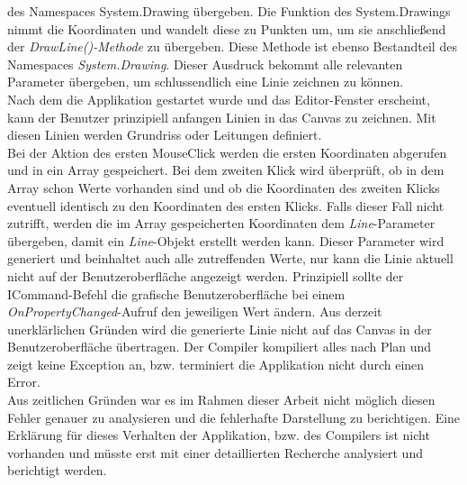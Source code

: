 des Namespaces System.Drawing übergeben. Die Funktion des System.Drawings nimmt die Koordinaten und wandelt diese zu Punkten um, um sie anschließend 
der \textit{DrawLine()-Methode} zu übergeben. Diese Methode ist ebenso Bestandteil des Namespaces \textit{System.Drawing}. Dieser Ausdruck bekommt alle relevanten Parameter 
übergeben, um schlussendlich eine Linie zeichnen zu können.
\\
\linebreak
Nach dem die Applikation gestartet wurde und das Editor-Fenster erscheint, kann der Benutzer prinzipiell anfangen Linien in das Canvas zu zeichnen. Mit 
diesen Linien werden Grundriss oder Leitungen definiert.
\\
\linebreak
Bei der Aktion des ersten MouseClick werden die ersten Koordinaten abgerufen und in ein Array gespeichert. Bei dem zweiten Klick wird überprüft, ob 
in dem Array schon Werte vorhanden sind und ob die Koordinaten des zweiten Klicks eventuell identisch zu den Koordinaten des ersten Klicks. Falls dieser Fall nicht zutrifft, 
werden die im Array gespeicherten Koordinaten dem \textit{Line}-Parameter übergeben, damit ein \textit{Line}-Objekt erstellt werden kann. 
\linebreak 
Dieser Parameter wird generiert und beinhaltet auch alle zutreffenden Werte, nur kann die Linie aktuell nicht auf der Benutzeroberfläche angezeigt werden.
Prinzipiell sollte der ICommand-Befehl die grafische Benutzeroberfläche bei einem \textit{OnPropertyChanged}-Aufruf den jeweiligen Wert ändern. 
Aus derzeit unerklärlichen Gründen wird die generierte Linie nicht auf das Canvas in der Benutzeroberfläche übertragen. Der Compiler kompiliert alles nach Plan 
und zeigt keine Exception an, bzw. terminiert die Applikation nicht durch einen Error.
\\
\linebreak
Aus zeitlichen Gründen war es im Rahmen dieser Arbeit nicht möglich diesen Fehler genauer zu analysieren und die fehlerhafte Darstellung zu berichtigen.
Eine Erklärung für dieses Verhalten der Applikation, bzw. des Compilers ist nicht vorhanden und müsste erst mit einer detaillierten Recherche analysiert und berichtigt werden. 



